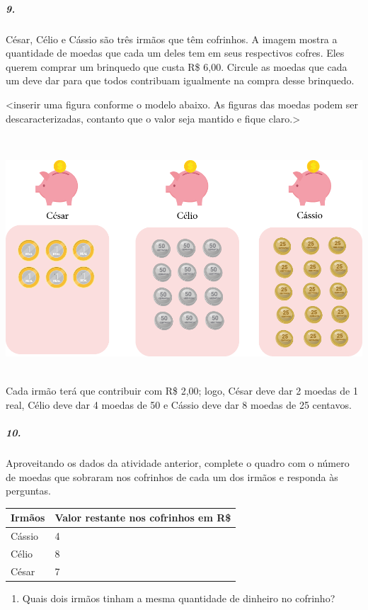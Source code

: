 \subparagraph{9.}\label{section-63}

César, Célio e Cássio são três irmãos que têm cofrinhos. A
imagem mostra a quantidade de moedas que cada um deles tem em
seus respectivos cofres. Eles querem comprar um brinquedo que custa R\$ 6,00.
Circule as moedas que cada um deve dar para que todos contribuam
igualmente na compra desse brinquedo.

\textless{}inserir uma figura conforme o modelo abaixo. As figuras das
moedas podem ser descaracterizadas, contanto que o valor seja mantido e
fique claro.\textgreater{}

\includegraphics[width=6.14583in,height=3.61068in]{media/image76.png}
Cada irmão terá que contribuir com R\$ 2,00; logo, César deve dar 2
moedas de 1 real, Célio deve dar 4 moedas de 50 e Cássio deve dar 8 moedas de 25 centavos.

\subparagraph{10.}\label{section-64}

Aproveitando os dados da atividade anterior, complete o quadro com o número de moedas que sobraram nos cofrinhos de cada um dos irmãos e responda às
perguntas.

\begin{longtable}[]{@{}ll@{}}
\toprule
Irmãos & Valor restante nos cofrinhos em R\$\tabularnewline
\midrule
\endhead
Cássio & 4\tabularnewline
Célio & 8\tabularnewline
César & 7\tabularnewline
\bottomrule
\end{longtable}

\begin{enumerate}
\def\labelenumi{\alph{enumi})}
\item
  Quais dois irmãos tinham a mesma quantidade de dinheiro no cofrinho?
\end{enumerate}

